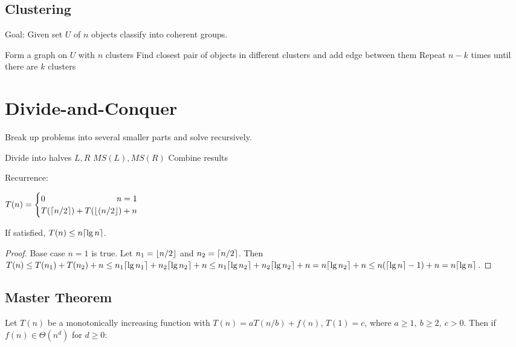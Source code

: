 \subsection*{Clustering}
Goal: Given set $U$ of $n$ objects classify into coherent groups. 

\begin{algorithm}[H]
\begin{algorithmic}[1]
\State Form a graph on $U$ with $n$ clusters
\State Find closest pair of objects in different clusters and add edge between them
\State Repeat $n - k$ times until there are $k$ clusters
\EndProcedure
\end{algorithmic}
\end{algorithm}

\section*{Divide-and-Conquer}
Break up problems into several smaller parts and solve recursively. 

\begin{algorithm}[H]
\begin{algorithmic}[1]
\State Divide into halves $L, R$
\State $MS(L), MS(R)$
\State Combine results
\EndProcedure
\end{algorithmic}
\end{algorithm}

Recurrence:

$T(n) = \begin{cases} 0 \hfill n = 1 \\ T(\ceil{n/2}) + T(\floor{(n/2}) + n \end{cases}$

If satisfied, $T(n) \leq n \lceil\lg{n}\rceil$. 
\begin{proof}[Proof]
Base case $n = 1$ is true. 
Let $n_1 = \lfloor n/2\rfloor$ and $n_2 = \lceil n/2\rceil$. 
Then $T(n) \leq T(n_1) + T(n_2) + n \leq n_1\lceil\lg{n_1}\rceil + n_2\lceil\lg{n_2}\rceil	 + n \leq n_1\lceil\lg{n_2}\rceil + n_2\lceil\lg{n_2}\rceil	 + n = n\lceil\lg{n_2}\rceil + n \leq n(\lceil\lg{n}\rceil - 1) + n = n\lceil\lg{n}\rceil$. 
\end{proof}

\subsection*{Master Theorem}
Let $T(n)$ be a monotonically increasing function with $T(n) = a T(n/b) + f(n)$, $T(1) = c$, where $a \geq 1,\ b \geq 2,\ c > 0$. 
Then if $f(n) \in \Theta(n^d)$ for $d \geq 0$:


